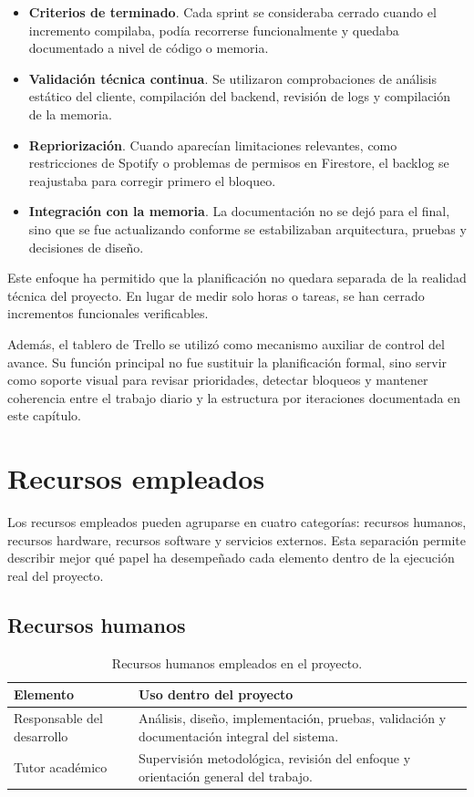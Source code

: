 \begin{itemize}
    \item \textbf{Criterios de terminado}. Cada sprint se consideraba cerrado cuando el incremento compilaba, podía recorrerse funcionalmente y quedaba documentado a nivel de código o memoria.
    \item \textbf{Validación técnica continua}. Se utilizaron comprobaciones de análisis estático del cliente, compilación del backend, revisión de logs y compilación de la memoria.
    \item \textbf{Repriorización}. Cuando aparecían limitaciones relevantes, como restricciones de Spotify o problemas de permisos en Firestore, el backlog se reajustaba para corregir primero el bloqueo.
    \item \textbf{Integración con la memoria}. La documentación no se dejó para el final, sino que se fue actualizando conforme se estabilizaban arquitectura, pruebas y decisiones de diseño.
\end{itemize}

Este enfoque ha permitido que la planificación no quedara separada de la
realidad técnica del proyecto. En lugar de medir solo horas o tareas, se han
cerrado incrementos funcionales verificables.

Además, el tablero de Trello se utilizó como mecanismo auxiliar de control del
avance. Su función principal no fue sustituir la planificación formal, sino
servir como soporte visual para revisar prioridades, detectar bloqueos y
mantener coherencia entre el trabajo diario y la estructura por iteraciones
documentada en este capítulo.

\section{Recursos empleados}
\label{sec:recursos_empleados}

Los recursos empleados pueden agruparse en cuatro categorías: recursos
humanos, recursos hardware, recursos software y servicios externos. Esta
separación permite describir mejor qué papel ha desempeñado cada elemento
dentro de la ejecución real del proyecto.

\subsection*{Recursos humanos}

\begin{table}[H]
\centering
\small
\renewcommand{\arraystretch}{1.1}
\begin{tabularx}{\textwidth}{|P{3.2cm}|Y|}
\hline
\textbf{Elemento} & \textbf{Uso dentro del proyecto} \\
\hline
Responsable del desarrollo & Análisis, diseño, implementación, pruebas, validación y documentación integral del sistema. \\
\hline
Tutor académico & Supervisión metodológica, revisión del enfoque y orientación general del trabajo. \\
\hline
\end{tabularx}
\caption{Recursos humanos empleados en el proyecto.}
\label{tab:recursos_humanos}
\end{table}

